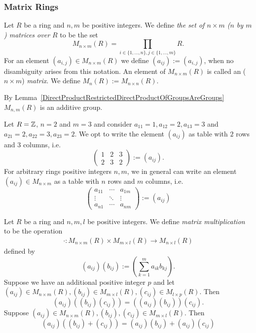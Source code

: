\subsubsection{Matrix Rings}
\begin{definition}
    Let $R$ be a ring and $n,m$ be positive integers. We define \textit{the set of $n\times m$ ($n$ by $m$) matrices over $R$} to be the set 
    $$M_{n\times m}(R) = \prod_{i\in \{1,\dots,n\}, j\in \{1,\dots,m\}} R.$$
    For an element $(a_{i,j})\in M_{n\times m}(R)$ we define $(a_{ij}):= (a_{i,j})$, when no disambiguity arises from this notation. An element of $M_{n\times m}(R)$ is called an ($n\times m$) \textit{matrix}. We define $M_n(R):= M_{n\times n}(R)$. 
\end{definition}
\begin{remark}\label{SetOfMatricesIsAnAdditiveGroup}
    By Lemma~\ref{DirectProductRestrictedDirectProductOfGroupsAreGroups} $M_{n,m}(R)$ is an additive group.
\end{remark}
\begin{example}
    Let $R= \mathbb{Z}$, $n = 2$ and $m = 3$ and consider $a_{11} = 1, a_{12} = 2, a_{13}=3$ and $a_{21} = 2, a_{22} = 3, a_{23} = 2$. We opt to write the element $(a_{ij})$ as table with $2$ rows and $3$ columns, i.e.
    $$\begin{pmatrix}
        1 & 2 & 3\\
        2 & 3 & 2
    \end{pmatrix} := (a_{ij}).$$
    For arbitrary rings positive integers $n,m$, we in general can write an element $(a_{ij})\in M_{n\times m}$ as a table with $n$ rows and $m$ columns, i.e.
    $$\begin{pmatrix}
        a_{11} & \cdots & a_{1m}\\
        \vdots & \ddots & \vdots\\
        a_{n1} & \cdots & a_{nm}
    \end{pmatrix} := (a_{ij})$$
\end{example}
\begin{lemma}\label{MatrixMultiplicationIsAssociativeAndDistributesOverAddition}
    Let $R$ be a ring and $n,m,l$ be positive integers. We define \textit{matrix multiplication} to be the operation 
    \begin{gather*}
        \cdot : M_{n\times m}(R) \times M_{m\times l}(R) \rightarrow M_{n\times l}(R)
    \end{gather*}
    defined by 
    $$(a_{ij})(b_{ij}) := \left(\sum_{k=1}^m a_{ik}b_{kj}\right).$$
    Suppose we have an additional positive integer $p$ and let $(a_{ij})\in M_{n\times m}(R),(b_{ij}) \in M_{m\times l}(R), (c_{ij})\in M_{l\times p}(R).$
    Then 
    $$(a_{ij})\left((b_{ij})(c_{ij})\right) =  \left((a_{ij})(b_{ij})\right)(c_{ij}). $$
    Suppose $(a_{ij})\in M_{n\times m}(R),(b_{ij}), (c_{ij})\in M_{m\times l}(R)$. Then 
    $$(a_{ij})\left((b_{ij})+(c_{ij})\right) = (a_{ij})(b_{ij}) + (a_{ij})(c_{ij})$$
\end{lemma}
